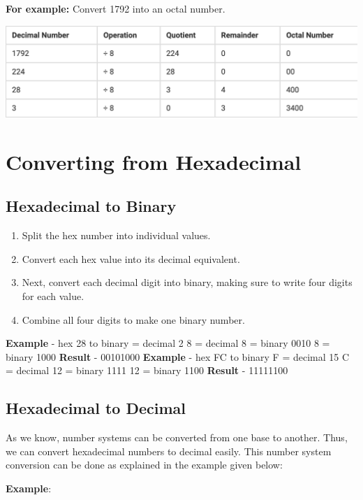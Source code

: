 \documentclass[pstricks,border=11pt]{article}
\begin{document}
\hfill \break
\textbf{For example:} Convert 1792 into an octal number.

\hfill \break
\includegraphics[scale=.5]{1792.png}

\hfill \break
\section{Converting from Hexadecimal}
\vspace{5mm}
\subsection{Hexadecimal to Binary}
\begin{enumerate}
    \item Split the hex number into individual values.
    \item Convert each hex value into its decimal equivalent.
    \item Next, convert each decimal digit into binary, making sure to write four digits for each value.
    \item Combine all four digits to make one binary number.
\end{enumerate}

\hfill \break
\textbf{Example} - hex 28 to binary
\hfill {} = decimal 2 8 = decimal 8
\hfill {} = binary 0010 8 = binary 1000
\hfill \break
\textbf{Result} - 00101000
\hfill \break
\textbf{Example} - hex FC to binary
\hfill \break
F = decimal 15 C = decimal 12
\hfill {} = binary 1111 12 = binary 1100
\hfill \break
\textbf{Result} - 11111100

\hfill \break
\subsection{Hexadecimal to Decimal}

As we know, number systems can be converted from one base to another. Thus, we can convert hexadecimal numbers to decimal easily. This number system conversion can be done as explained in the example given below:

\hfill \break
\textbf{Example}:
\end{document}
